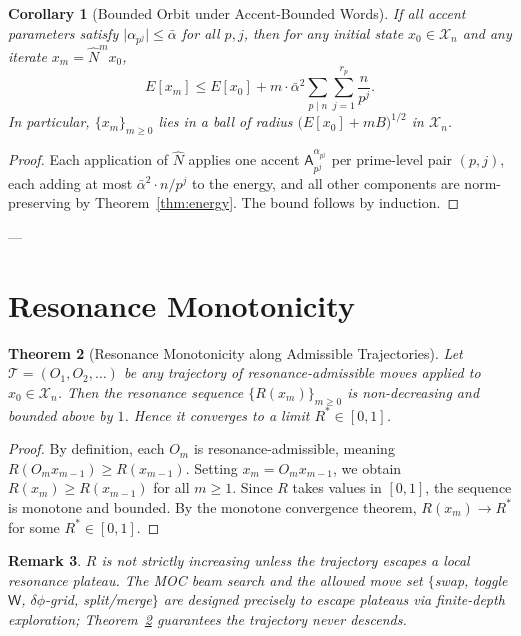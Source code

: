 \documentclass[11pt]{amsart}
\newtheorem{theorem}{Theorem}[section]
\newtheorem{corollary}[theorem]{Corollary}
\newtheorem{remark}[theorem]{Remark}
\newcommand{\X}{\mathcal{X}}
\newcommand{\Ap}{\mathsf{A}}
\newcommand{\Wp}{\mathsf{W}}
\newcommand{\bN}{\widehat{N}}
\newcommand{\abs}[1]{\lvert #1 \rvert}
\begin{document}
\begin{corollary}[Bounded Orbit under Accent-Bounded Words]\label{cor:bounded-orbit}
If all accent parameters satisfy $\abs{\alpha_{p^j}} \leq \bar\alpha$ for all $p, j$, then for any initial state $x_0 \in \X_n$ and any iterate $x_m = \bN^m x_0$,
\[
  E[x_m] \leq E[x_0] + m \cdot \bar\alpha^2 \sum_{p \mid n}\sum_{j=1}^{r_p} \frac{n}{p^j}.
\]
In particular, $\{x_m\}_{m \geq 0}$ lies in a ball of radius $\bigl(E[x_0] + m B\bigr)^{1/2}$ in $\X_n$.
\end{corollary}

\begin{proof}
Each application of $\bN$ applies one accent $\Ap^{\alpha_{p^j}}_{p^j}$ per prime-level pair $(p,j)$, each adding at most $\bar\alpha^2 \cdot n/p^j$ to the energy, and all other components are norm-preserving by Theorem~\ref{thm:energy}. The bound follows by induction.
\end{proof}

---

\section{Resonance Monotonicity}

\begin{theorem}[Resonance Monotonicity along Admissible Trajectories]\label{thm:resonance-mono}
Let $\mathcal{T} = (O_1, O_2, \ldots)$ be any trajectory of resonance-admissible moves applied to $x_0 \in \X_n$. Then the resonance sequence $\{R(x_m)\}_{m \geq 0}$ is non-decreasing and bounded above by $1$. Hence it converges to a limit $R^* \in [0,1]$.
\end{theorem}

\begin{proof}
By definition, each $O_m$ is resonance-admissible, meaning $R(O_m x_{m-1}) \geq R(x_{m-1})$. Setting $x_m = O_m x_{m-1}$, we obtain $R(x_m) \geq R(x_{m-1})$ for all $m \geq 1$. Since $R$ takes values in $[0,1]$, the sequence is monotone and bounded. By the monotone convergence theorem, $R(x_m) \to R^*$ for some $R^* \in [0,1]$.
\end{proof}

\begin{remark}
$R$ is not strictly increasing unless the trajectory escapes a local resonance plateau. The MOC beam search and the allowed move set $\{$swap, toggle $\Wp$, $\delta\phi$-grid, split/merge$\}$ are designed precisely to escape plateaus via finite-depth exploration; Theorem~\ref{thm:resonance-mono} guarantees the trajectory never descends.
\end{remark}
\end{document}
